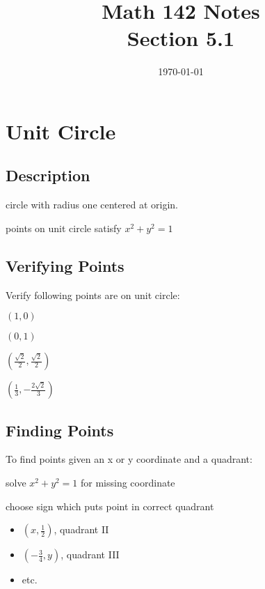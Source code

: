 \documentclass{exam}
\title{Math 142 Notes \\ Section 5.1}
\date{\today}
\begin{document}
  \maketitle
  \tableofcontents

  \section{Unit Circle}

  \subsection{Description}
  \begin{itemize*}
    \item circle with radius one centered at origin.
    \item points on unit circle satisfy $x^2 + y^2 = 1$
  \end{itemize*}

  \subsection{Verifying Points}
  Verify following points are on unit circle:
  \begin{itemize*}
    \item $(1, 0)$
    \item $(0, 1)$
    \item $\left( \frac{\sqrt{2}}{2}, \frac{\sqrt{2}}{2} \right)$
    \item $\left( \frac{1}{3}, - \frac{2 \sqrt{2}}{3} \right)$
  \end{itemize*}

  \subsection{Finding Points}
  
  To find points given an x or y coordinate and a quadrant:
  \begin{itemize*}
    \item solve $x^2 + y^2 = 1$ for missing coordinate
    \item choose sign which puts point in correct quadrant
  \end{itemize*}

  \begin{itemize}
    \item $\left( x, \frac{1}{2} \right)$, quadrant II
    \item $\left( -\frac{3}{4}, y \right)$, quadrant III
    \item etc.
  \end{itemize}
\end{document}
